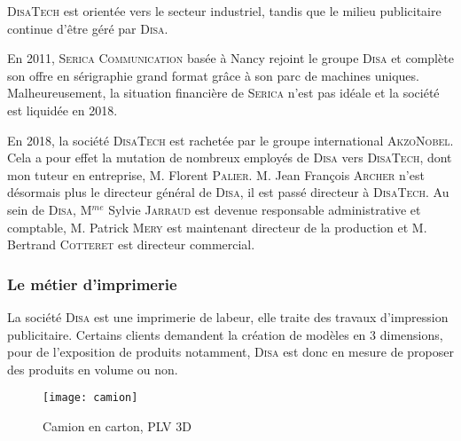 \textsc{DisaTech} est orientée vers le secteur industriel, tandis que le milieu publicitaire continue
d’être géré par \textsc{Disa}.

En 2011, \textsc{Serica Communication} basée à Nancy rejoint le groupe \textsc{Disa} et complète son offre en sérigraphie grand format grâce à son parc de machines uniques.
Malheureusement, la situation financière de \textsc{Serica} n'est pas idéale et la société est liquidée en 2018.

En 2018, la société \textsc{DisaTech} est rachetée par le groupe international \textsc{AkzoNobel}.
Cela a pour effet la mutation de nombreux employés de \textsc{Disa} vers \textsc{DisaTech}, dont mon tuteur en entreprise, M. Florent \textsc{Palier}.
M. Jean François \textsc{Archer} n'est désormais plus le directeur général de \textsc{Disa}, il est passé directeur à \textsc{DisaTech}.
Au sein de \textsc{Disa}, M$^{me}$ Sylvie \textsc{Jarraud} est devenue responsable administrative et comptable, M. Patrick \textsc{Mery} est maintenant directeur de la production et M. Bertrand \textsc{Cotteret} est directeur commercial.

\newpage
\subsubsection{Le métier d’imprimerie}

La société \textsc{Disa} est une imprimerie de labeur, elle traite des travaux d'impression publicitaire.
Certains clients demandent la création de modèles en 3 dimensions, pour de l'exposition de produits notamment, \textsc{Disa} est donc en mesure de proposer des produits en volume ou non.

\FloatBarrier
\begin{figure}[h!]
    \begin{center}
        \texttt{[image: camion]}
    \end{center}
    \caption{Camion en carton, PLV 3D}
    \label{figure:plv3d}
\end{figure}
\FloatBarrier

